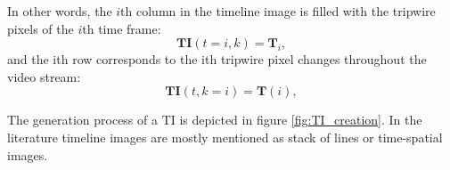 In other words, the $i$th column in the timeline image is filled with the tripwire pixels of the $i$th time frame:
\begin{displaymath}
	\boldsymbol{TI}(t=i,k)=\boldsymbol{T}_i,
\end{displaymath}
and the $\text{i}$th row corresponds to the $\text{i}$th tripwire pixel changes throughout the video stream:
\begin{displaymath}
\boldsymbol{TI}(t,k=i)=\boldsymbol{T}(i),
\end{displaymath}

The generation process of a TI is depicted in figure \ref{fig:TI_creation}.
In the literature timeline images are mostly mentioned as stack of lines or time-spatial images.
